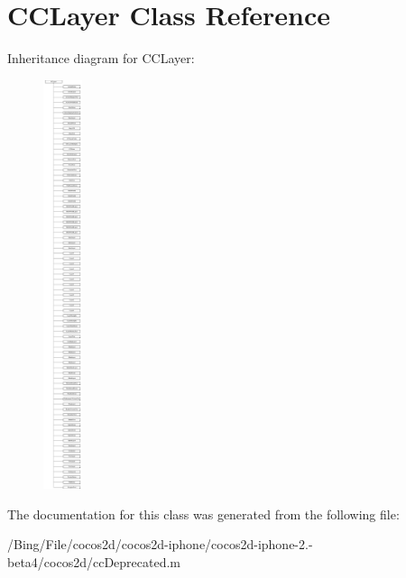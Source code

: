 \hypertarget{class_c_c_layer}{\section{C\-C\-Layer Class Reference}
\label{class_c_c_layer}
}
Inheritance diagram for C\-C\-Layer\-:\begin{figure}[H]
\begin{center}
\leavevmode
\includegraphics[height=12.000000cm]{class_c_c_layer}
\end{center}
\end{figure}


The documentation for this class was generated from the following file\-:\begin{DoxyCompactItemize}
\item 
/\-Bing/\-File/cocos2d/cocos2d-\/iphone/cocos2d-\/iphone-\/2.-\/beta4/cocos2d/cc\-Deprecated.\-m\end{DoxyCompactItemize}
